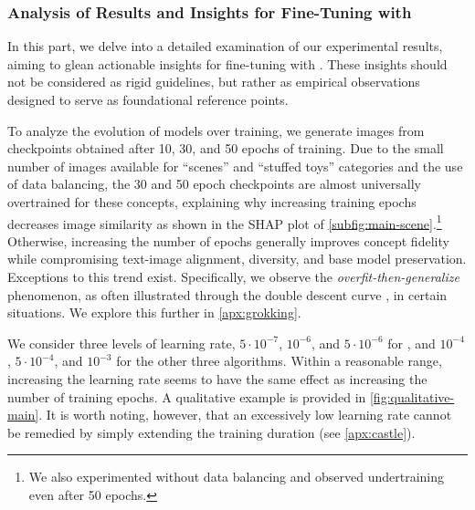 \subsubsection{Analysis of Results and Insights for Fine-Tuning with \lycoris}
\label{subsubsec:algo-config-impact}


In this part, we delve into a detailed examination of our experimental results, aiming to glean actionable insights for fine-tuning with \lycoris. These insights should not be considered as rigid guidelines, but rather as empirical observations designed to serve as foundational reference points.

To analyze the evolution of models over training, we generate images from checkpoints obtained after 10, 30, and 50 epochs of training.
Due to the small number of images available for ``scenes'' and ``stuffed toys'' categories and the use of data balancing, the 30 and 50 epoch checkpoints are almost universally overtrained for these concepts, explaining why increasing training epochs decreases image similarity as shown in the SHAP plot of \cref{subfig:main-scene}.\footnote{We also experimented without data balancing and observed undertraining even after 50 epochs.}
Otherwise, increasing the number of epochs generally improves concept fidelity while compromising text-image alignment, diversity, and base model preservation. Exceptions to this trend exist.
Specifically, we observe the \emph{overfit-then-generalize} phenomenon, as often illustrated through the double descent curve \citep{nakkiran2021deep}, in certain situations. We explore this further in \cref{apx:grokking}.




We consider three levels of learning rate,
$5\cdot 10^{-7}$, $10^{-6}$, and $5\cdot 10^{-6}$ for \nt, and
$10^{-4}$, $5\cdot 10^{-4}$, and $10^{-3}$ for the other three algorithms.
Within a reasonable range, increasing the learning rate seems to have the same effect as increasing the number of training epochs. A qualitative example is provided in \cref{fig:qualitative-main}.
It is worth noting, however, that an excessively low learning rate cannot be remedied by simply extending the training duration (see \cref{apx:castle}).

